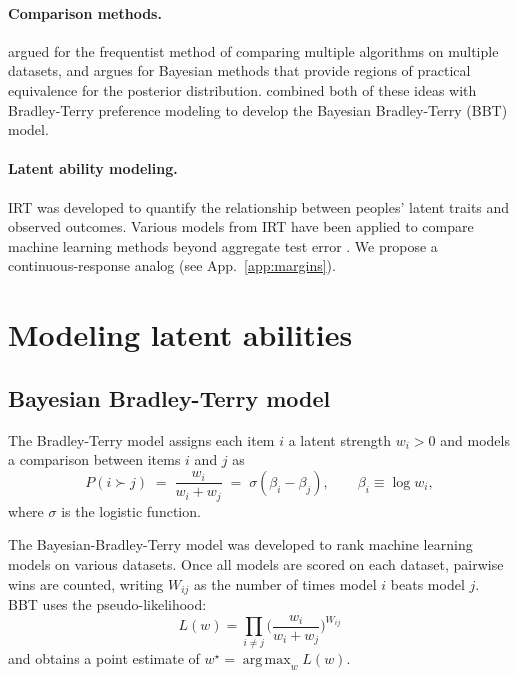 \documentclass{article}
\DeclareMathOperator*{\argmax}{arg\,max}
\begin{document}
\paragraph{Comparison methods.} \citet{demsar2006} argued for the frequentist method of comparing multiple algorithms on multiple datasets, and \citet{benavoli2017} argues for Bayesian methods that provide regions of practical equivalence for the posterior distribution. \citet{wainer2023} combined both of these ideas with Bradley-Terry preference modeling \citep{bradley1952, zermelo1929} to develop the Bayesian Bradley-Terry (BBT) model.

\paragraph{Latent ability modeling.} IRT \citep{lord1968, birnbaum1968} was developed to quantify the relationship between peoples' latent traits and observed outcomes. Various models from IRT have been applied to compare machine learning methods beyond aggregate test error \citep{lalor2016, rodriguez2021, vania2021}. We propose a continuous-response analog (see App.~\ref{app:margins}).

\section{Modeling latent abilities}
\subsection{Bayesian Bradley-Terry model}

The Bradley-Terry model \citep{bradley1952, zermelo1929} assigns each item $i$ a
latent strength $w_i > 0$ and models a comparison between items $i$ and $j$ as
\begin{equation}
  P(i \succ j) \;=\; \frac{w_i}{w_i + w_j} \;=\; \sigma(\beta_i - \beta_j),
  \qquad \beta_i \equiv \log w_i ,
  \label{eq:bt}
\end{equation}
where $\sigma$ is the logistic function.

The Bayesian-Bradley-Terry model \citep{wainer2023} was developed to rank machine learning models on various datasets. Once all models are scored on each dataset, pairwise wins are counted, writing $W_{ij}$ as the number of times model $i$ beats model $j$. BBT uses the pseudo-likelihood: 
\begin{equation}
    L(w) = \prod_{i \neq j} \biggl( \frac{w_i}{w_i + w_j}\biggr)^{W_{ij}}
\end{equation}
and obtains a point estimate of $w^\star = \argmax_w L(w)$.
\end{document}
